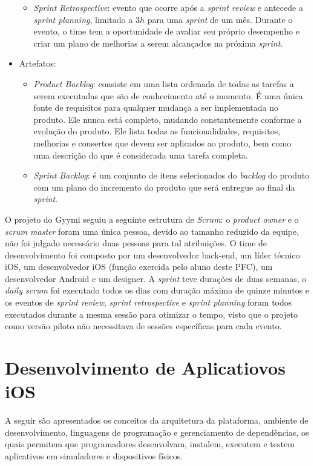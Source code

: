 \begin{itemize}
\begin{itemize}
        \item \textit{Sprint Retrospective}: evento que ocorre após a \textit{sprint review} e antecede a \textit{sprint planning}, limitado a $3h$ para uma \textit{sprint} de um mês. Durante o evento, o time tem a oportunidade de avaliar seu próprio desempenho e criar um plano de melhorias a serem alcançados na próxima \textit{sprint}.
    \end{itemize}
    \item Artefatos:
    \begin{itemize}
        \item \textit{Product Backlog}: consiste em uma lista ordenada de todas as tarefas a serem executadas que são de conhecimento até o momento. É uma única fonte de requisitos para qualquer mudança a ser implementada no produto. Ele nunca está completo, mudando constantemente conforme a evolução do produto. Ele lista todas as funcionalidades, requisitos, melhorias e consertos que devem ser aplicados ao produto, bem como uma descrição do que é considerada uma tarefa completa.
        \item \textit{Sprint Backlog}: é um conjunto de itens selecionados do \textit{backlog} do produto com um plano do incremento do produto que será entregue ao final da \textit{sprint}.
    \end{itemize}
\end{itemize}

O projeto do Gyymi seguiu a seguinte estrutura de \textit{Scrum}: o \textit{product owner} e o \textit{scrum master} foram uma única pessoa, devido ao tamanho reduzido da equipe, não foi julgado necessário duas pessoas para tal atribuições. O time de desenvolvimento foi composto por um desenvolvedor back-end, um líder técnico iOS, um desenvolvedor iOS (função exercida pelo aluno deste PFC), um desenvolvedor Android e um designer. A \textit{sprint} teve durações de duas semanas, o \textit{daily scrum} foi executado todos os dias com duração máxima de quinze minutos e os eventos de \textit{sprint review}, \textit{sprint retrospective} e \textit{sprint planning} foram todos executados durante a mesma sessão para otimizar o tempo, visto que o projeto como versão piloto não necessitava de sessões específicas para cada evento.

\section{Desenvolvimento de Aplicatiovos iOS}
A seguir são apresentados os conceitos da arquitetura da plataforma, ambiente de desenvolvimento, linguagens de programação e gerenciamento de dependências, os quais permitem que programadores desenvolvam, instalem, executem e testem aplicativos em simuladores e dispositivos físicos.

